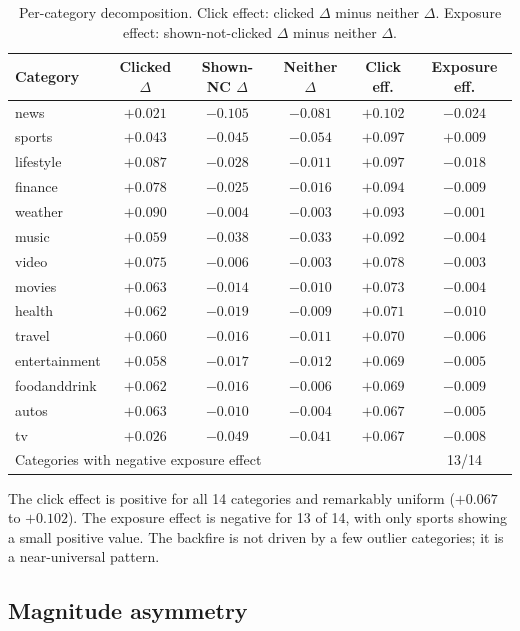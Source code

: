 \documentclass[11pt]{article}
\begin{document}
\begin{table}[ht]
\centering
\caption{Per-category decomposition. Click effect: clicked $\Delta$ minus neither $\Delta$. Exposure effect: shown-not-clicked $\Delta$ minus neither $\Delta$.}
\label{tab:exposure_percat}
\small
\begin{tabular}{lccccc}
\toprule
Category & Clicked $\Delta$ & Shown-NC $\Delta$ & Neither $\Delta$ & Click eff. & Exposure eff. \\
\midrule
news & $+0.021$ & $-0.105$ & $-0.081$ & $+0.102$ & $-0.024$ \\
sports & $+0.043$ & $-0.045$ & $-0.054$ & $+0.097$ & $+0.009$ \\
lifestyle & $+0.087$ & $-0.028$ & $-0.011$ & $+0.097$ & $-0.018$ \\
finance & $+0.078$ & $-0.025$ & $-0.016$ & $+0.094$ & $-0.009$ \\
weather & $+0.090$ & $-0.004$ & $-0.003$ & $+0.093$ & $-0.001$ \\
music & $+0.059$ & $-0.038$ & $-0.033$ & $+0.092$ & $-0.004$ \\
video & $+0.075$ & $-0.006$ & $-0.003$ & $+0.078$ & $-0.003$ \\
movies & $+0.063$ & $-0.014$ & $-0.010$ & $+0.073$ & $-0.004$ \\
health & $+0.062$ & $-0.019$ & $-0.009$ & $+0.071$ & $-0.010$ \\
travel & $+0.060$ & $-0.016$ & $-0.011$ & $+0.070$ & $-0.006$ \\
entertainment & $+0.058$ & $-0.017$ & $-0.012$ & $+0.069$ & $-0.005$ \\
foodanddrink & $+0.062$ & $-0.016$ & $-0.006$ & $+0.069$ & $-0.009$ \\
autos & $+0.063$ & $-0.010$ & $-0.004$ & $+0.067$ & $-0.005$ \\
tv & $+0.026$ & $-0.049$ & $-0.041$ & $+0.067$ & $-0.008$ \\
\midrule
\multicolumn{5}{l}{Categories with negative exposure effect} & 13/14 \\
\bottomrule
\end{tabular}
\end{table}
\FloatBarrier

The click effect is positive for all 14 categories and remarkably uniform ($+0.067$ to $+0.102$). The exposure effect is negative for 13 of 14, with only sports showing a small positive value. The backfire is not driven by a few outlier categories; it is a near-universal pattern.

\subsection{Magnitude asymmetry}
\end{document}
